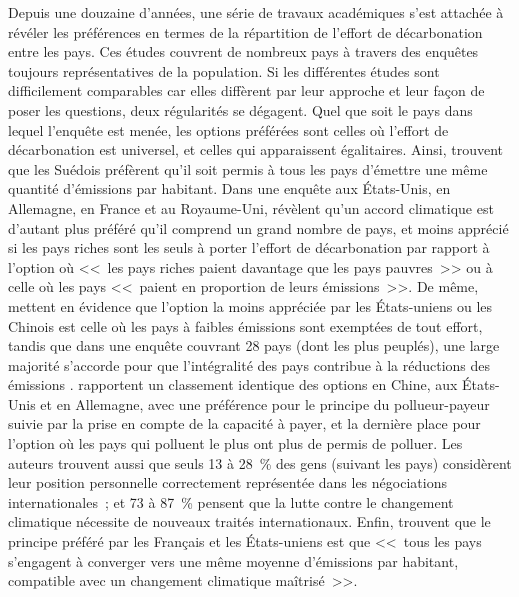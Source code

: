 \documentclass[a5paper,french]{memoir}
\begin{document}
Depuis une douzaine d'années, une série de travaux académiques s'est attachée à révéler les préférences en termes de la répartition de l'effort de décarbonation entre les pays. Ces études couvrent de nombreux pays à travers des enquêtes toujours représentatives de la population. Si les différentes études sont difficilement comparables car elles diffèrent par leur approche et leur façon de poser les questions, deux régularités se dégagent. Quel que soit le pays dans lequel l'enquête est menée, les options préférées sont celles où l'effort de décarbonation est universel, et celles qui apparaissent égalitaires. %
Ainsi, \citet{carlsson_is_2011} trouvent que les Suédois préfèrent qu'il soit permis à tous les pays d'émettre une même quantité d'émissions par habitant. Dans une enquête aux États-Unis, en Allemagne, en France et au Royaume-Uni, \citet{bechtel_mass_2013} révèlent qu'un accord climatique est d'autant plus préféré qu'il comprend un grand nombre de pays, %
et moins apprécié si les pays riches sont les seuls à porter l'effort de décarbonation par rapport à l'option où <<~les pays riches paient davantage que les pays pauvres~>> ou à celle où les pays <<~paient en proportion de leurs émissions~>>. De même, \citet{carlsson_fair_2013} mettent en évidence que l'option la moins appréciée par les États-uniens ou les Chinois est celle où les pays à faibles émissions sont exemptées de tout effort, tandis que dans une enquête couvrant 28 pays (dont les plus peuplés), une large majorité s'accorde pour que l'intégralité des pays contribue à la réductions des émissions \citep{dabla-norris_public_2023}. \citet{schleich_citizens_2016} rapportent un classement identique des options en Chine, aux États-Unis et en Allemagne, avec une préférence pour le principe du pollueur-payeur suivie par la prise en compte de la capacité à payer, et la dernière place pour l'option où les pays qui polluent le plus ont plus de permis de polluer. Les auteurs trouvent aussi que seuls 13 à 28~\% des gens (suivant les pays) considèrent leur position personnelle correctement représentée dans les négociations internationales~; et 73 à 87~\% pensent que la lutte contre le changement climatique nécessite de nouveaux traités internationaux. Enfin, \citet{meilland_international_2023} trouvent que le principe préféré par les Français et les États-uniens est que <<~tous les pays s'engagent à converger vers une même moyenne d'émissions par habitant, compatible avec un changement climatique maîtrisé~>>.
\end{document}
